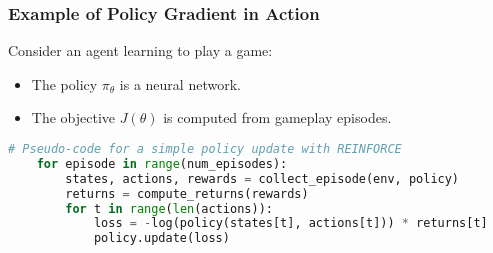 \documentclass[aspectratio=169]{beamer}
\begin{document}
\begin{frame}[fragile]
    \frametitle{Example of Policy Gradient in Action}
    Consider an agent learning to play a game:

    \begin{itemize}
        \item The policy \( \pi_\theta \) is a neural network.
        \item The objective \( J(\theta) \) is computed from gameplay episodes.
    \end{itemize}

    \begin{lstlisting}[language=Python]
    # Pseudo-code for a simple policy update with REINFORCE
    for episode in range(num_episodes):
        states, actions, rewards = collect_episode(env, policy)
        returns = compute_returns(rewards)
        for t in range(len(actions)):
            loss = -log(policy(states[t], actions[t])) * returns[t]
            policy.update(loss)
    \end{lstlisting}
\end{frame}
\end{document}
